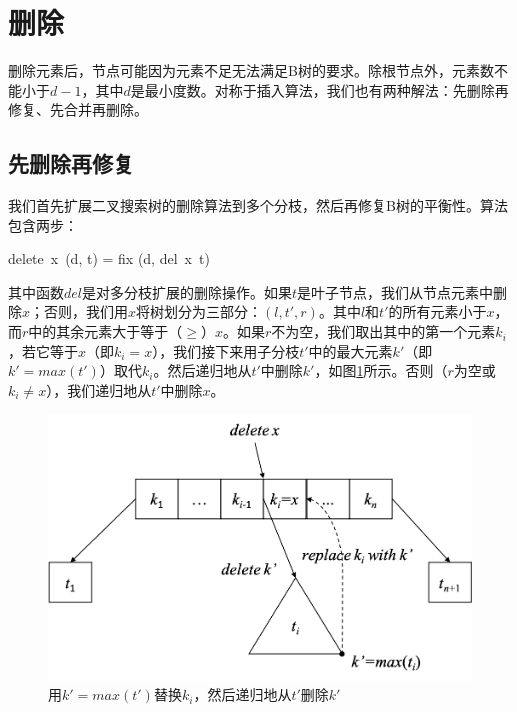 \documentclass{ctexart}
\begin{document}
\begin{Exercise}
\end{Exercise}

\section{删除}

删除元素后，节点可能因为元素不足无法满足B树的要求。除根节点外，元素数不能小于$d - 1$，其中$d$是最小度数。对称于插入算法，我们也有两种解法：先删除再修复、先合并再删除。

\subsection{先删除再修复}

我们首先扩展二叉搜索树的删除算法到多个分枝，然后再修复B树的平衡性。算法包含两步：

\be
delete\ x\ (d, t) = fix (d, del\ x\ t)
\ee

其中函数$del$是对多分枝扩展的删除操作。如果$t$是叶子节点，我们从节点元素中删除$x$；否则，我们用$x$将树划分为三部分：$(l, t', r)$。其中$l$和$t'$的所有元素小于$x$，而$r$中的其余元素大于等于（$\geq$）$x$。如果$r$不为空，我们取出其中的第一个元素$k_i$，若它等于$x$（即$k_i = x$），我们接下来用子分枝$t'$中的最大元素$k'$（即$k' = max(t')$）取代$k_i$。然后递归地从$t'$中删除$k'$，如图\ref{fig:btree-del}所示。否则（$r$为空或$k_i \neq x$），我们递归地从$t'$中删除$x$。

\begin{figure}[htbp]
  \centering
  \includegraphics[scale=0.45]{img/btree-del.png}
  \caption{用$k' = max(t')$替换$k_i$，然后递归地从$t'$删除$k'$}
  \label{fig:btree-del}
\end{figure}
\end{document}
